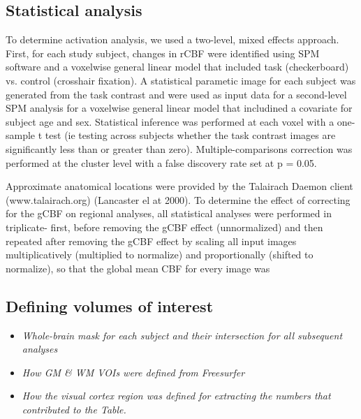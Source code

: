 \subsection{Statistical analysis}
To determine activation analysis, we used a two-level, mixed effects approach.  First, for each study subject, changes in rCBF were identified using SPM software and a voxelwise general linear model that included task (checkerboard) vs. control (crosshair fixation). A statistical parametic image for each subject was generated from the task contrast and were used as input data for a second-level SPM analysis for a voxelwise general linear model that includined a covariate for subject age and sex. Statistical inference was performed at each voxel with a one-sample t test (ie testing across subjects whether the task contrast images are significantly less than or greater than zero). 
Multiple-comparisons correction was performed at the cluster level with a false discovery rate set at p = 0.05. 

Approximate anatomical locations were provided by the Talairach Daemon client (www.talairach.org) (Lancaster el at 2000). 
To determine the effect of correcting for the gCBF on regional analyses, all statistical analyses were performed in triplicate- first, before removing the gCBF effect (unnormalized) and then repeated after removing the gCBF effect by scaling all input images multiplicatively (multiplied to normalize) and proportionally (shifted to normalize), so that the global mean CBF for every image was 


\subsection{Defining volumes of interest}
\begin{itemize}
\item \textit{Whole-brain mask for each subject and their intersection for all subsequent analyses}
\item \textit{How GM & WM VOIs were defined from Freesurfer}
\item \textit{How the visual cortex region was defined for extracting the numbers that contributed to the Table.}
\end{itemize}






